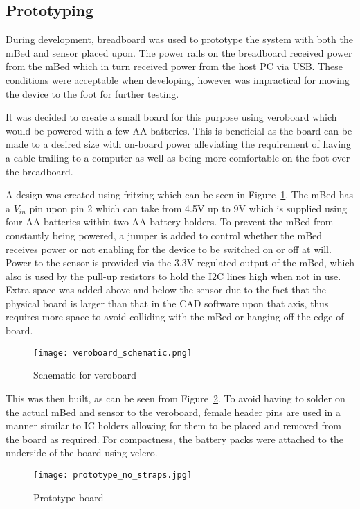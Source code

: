 \subsection{Prototyping}

During development, breadboard was used to prototype the system with both the mBed and sensor placed upon. The power rails on the breadboard received power from the mBed which in turn received power from the host PC via USB. These conditions were acceptable when developing, however was impractical for moving the device to the foot for further testing. 

It was decided to create a small board for this purpose using veroboard which would be powered with a few AA batteries. This is beneficial as the board can be made to a desired size with on-board power alleviating the requirement of having a cable trailing to a computer as well as being more comfortable on the foot over the breadboard.

A design was created using fritzing \cite{fritzing} which can be seen in Figure~\ref{fig:veroboard_schematic}. The mBed has a $V_{in}$ pin upon pin 2 which can take from 4.5V up to 9V which is supplied using four AA batteries within two AA battery holders. To prevent the mBed from constantly being powered, a jumper is added to control whether the mBed receives power or not enabling for the device to be switched on or off at will. Power to the sensor is provided via the 3.3V regulated output of the mBed, which also is used by the pull-up resistors to hold the I2C lines high when not in use. Extra space was added above and below the sensor due to the fact that the physical board is larger than that in the CAD software upon that axis, thus requires more space to avoid colliding with the mBed or hanging off the edge of board.

\begin{figure}
	\centering
	\texttt{[image: veroboard\_schematic.png]}
	\caption{Schematic for veroboard}
	\label{fig:veroboard_schematic}
\end{figure}

This was then built, as can be seen from Figure~\ref{fig:board}. To avoid having to solder on the actual mBed and sensor to the veroboard, female header pins are used in a manner similar to IC holders allowing for them to be placed and removed from the board as required. For compactness, the battery packs were attached to the underside of the board using velcro. 

\begin{figure}
	\centering
	\texttt{[image: prototype\_no\_straps.jpg]}
	\caption{Prototype board}
	\label{fig:board}
\end{figure}

